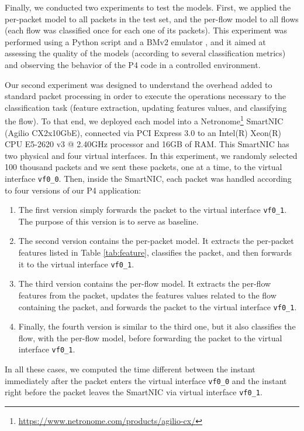 Finally, we conducted two experiments to test the models. First, we applied the per-packet model to all packets in the test set, and the per-flow model to all flows (each flow was classified once for each one of its packets).
This experiment was performed using a Python script and a BMv2 emulator \cite{p4-bmv2}, and it aimed at assessing the quality of the models (according to several classification metrics) and observing the behavior of the P4 code in a controlled environment. 

Our second experiment was designed to understand the overhead added to standard packet processing in order to execute the operations necessary to the classification task (feature extraction, updating features values, and classifying the flow).
To that end, we deployed each model into a Netronome\footnote{\url{https://www.netronome.com/products/agilio-cx/}} SmartNIC (Agilio  CX2x10GbE), connected via PCI Express 3.0 to an Intel(R) Xeon(R) CPU E5-2620 v3 @ 2.40GHz processor and 16GB of RAM. This SmartNIC has two physical and four virtual interfaces. In this experiment, we randomly selected 100 thousand packets and we sent these packets, one at a time, to the virtual interface \texttt{vf0\_0}. Then, inside the SmartNIC, each packet was handled according to four versions of our P4 application:
\begin{enumerate}
    \item The first version simply forwards the packet to the virtual interface \texttt{vf0\_1}. The purpose of this version is to serve as baseline.
    \item The second version contains the per-packet model. It extracts the per-packet features listed in Table \ref{tab:feature}, classifies the packet, and then forwards it to the virtual interface \texttt{vf0\_1}.
    \item The third version contains the per-flow model. It extracts the per-flow features from the packet, updates the features values related to the flow containing the packet, and forwards the packet to the virtual interface \texttt{vf0\_1}.
    \item Finally, the fourth version is similar to the third one, but it also classifies the flow, with the per-flow model, before forwarding the packet to the virtual interface \texttt{vf0\_1}.
\end{enumerate}
In all these cases, we computed the time different between the instant immediately after the packet enters the virtual interface \texttt{vf0\_0} and the instant right before the packet leaves the SmartNIC via virtual interface \texttt{vf0\_1}.

